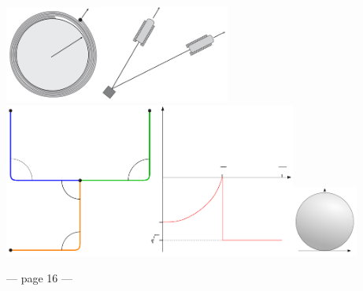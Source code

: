 \documentclass[
]{article}
\begin{document}
\includegraphics[width=1.23611in,height=1.25in]{7c2ba21d717249b59a8d5c87a07c8bb7/media/image5.png}\includegraphics[width=1.69444in,height=1.26389in]{7c2ba21d717249b59a8d5c87a07c8bb7/media/image6.png}\includegraphics[width=3.79167in,height=1.98611in]{7c2ba21d717249b59a8d5c87a07c8bb7/media/image7.png}\includegraphics[width=0.84722in,height=0.91667in]{7c2ba21d717249b59a8d5c87a07c8bb7/media/image8.png}

--- page 16 ---
\end{document}
